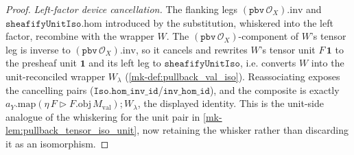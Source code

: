 \begin{proof}
  \emph{Left-factor device cancellation.} The flanking legs
  \((\mathtt{pbv}\,\mathcal{O}_X).\mathrm{inv}\) and \(\mathtt{sheafifyUnitIso}.\mathrm{hom}\)
  introduced by the substitution, whiskered into the left factor, recombine with the wrapper \(W\). The
  \((\mathtt{pbv}\,\mathcal{O}_X)\)-component of \(W\)'s tensor leg is inverse to
  \((\mathtt{pbv}\,\mathcal{O}_X).\mathrm{inv}\), so it cancels and rewrites \(W\)'s tensor unit
  \(F\,\mathbf 1\) to the presheaf unit \(\mathbf 1\) and its left leg to \(\mathtt{sheafifyUnitIso}\),
  i.e. converts \(W\) into the unit-reconciled wrapper \(W_{\lambda}\) (\ref{mk-def:pullback_val_iso}).
  Reassociating exposes the cancelling pairs (\(\mathtt{Iso.hom\_inv\_id}\)/\(\mathtt{inv\_hom\_id}\)),
  and the composite is exactly \(a_Y.\mathrm{map}(\eta\,F \rhd F.\mathrm{obj}\,M_{\mathrm{val}})
  \mathbin{;} W_{\lambda}\), the displayed identity. This is the unit-side analogue of the whiskering
  for the unit pair in \ref{mk-lem:pullback_tensor_iso_unit}, now retaining the whisker rather than
  discarding it as an isomorphism.
\end{proof}

